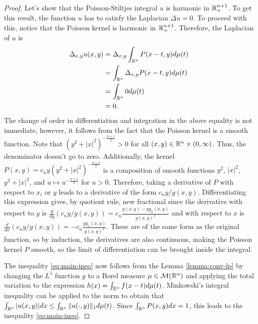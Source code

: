 \begin{proof}
    Let's show that the Poisson-Stiltjes integral $u$ is harmonic in $\mathbb R^{n+1}_+$. To get this result, the function $u$ has to satisfy the Laplacian $\Delta u=0$. To proceed with this, notice that the Poisson kernel is harmonic in $\mathbb R^{n+1}_+$. Therefore, the Laplacian of $u$ is
    \begin{align*}
        \Delta_{x,y} u(x,y)&=\Delta_{x,y}\int_{\mathbb R^n}P(x-t,y)d\mu(t) \\
        &=\int_{\mathbb R^n}\Delta_{x,y}P(x-t,y)d\mu(t) \\
        &=\int_{\mathbb R^n}0d\mu(t) \\
        &=0.
    \end{align*}
    The change of order in differentiation and integration in the above equality is not immediate, however, it follows from the fact that the Poisson kernel is a smooth function. Note that $(y^2+|x|^2)^{-\frac{n+1}{2}}>0$ for all $(x,y)\in\mathbb R^n\times(0,\infty)$. Thus, the denominator doesn't go to zero. Additionally, the kernel $P(x,y)=c_ny(y^2+|x|^2)^{-\frac{n+1}{2}}$ is a composition of smooth functions $y^2$, $|x|^2$, $y^2+|x|^2$, and $u\mapsto u^{-\frac{n+1}{2}}$ for $u>0$. Therefore, taking a derivative of $P$ with respect to $x_i$ or $y$ leads to a derivative of the form $c_ny/g(x,y)$. Differentiating this expression gives, by quotient rule, new fractional since the derivative with respect to $y$ is $\frac{d}{dy}(c_ny/g(x,y))=c_n\frac{g(x,y)-yg_y(x,y)}{g(x,y)^2}$ and with respect to $x$ is $\frac{d}{dx}(c_ny/g(x,y))=-c_n\frac{yg_x(x,y)}{g(x,y)^2}$. These are of the same form as the original function, so by induction, the derivatives are also continuous, making the Poisson kernel $P$ smooth, so the limit of differentiation can be brought inside the integral.

    The inequality \ref{eq:main-ineq} now follows from the Lemma \ref{lemma:conv-lp} by changing the $L^1$ function $g$ to a Borel measure $\mu\in\mathcal M(\mathbb R^n)$ and applying the total variation to the expression $h(x)=\int_{\mathbb R^n}f(x-t)d\mu(t)$. Minkowski's integral inequality can be applied to the norm to obtain that $\int_{\mathbb R^n}|u(x,y)|dx\leq\int_{\mathbb R^n}\|u(\cdot,y)\|_1d\mu(t)$. Since $\int_{\mathbb R^n}P(x,y)dx=1$, this leads to the inequality \ref{eq:main-ineq}.


\end{proof}
